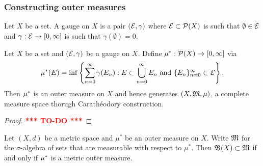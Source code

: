 \documentclass[a4paper]{article}
\newcommand{\TODO}{\textcolor{red}{\textbf{*** TO-DO ***}}}
\begin{document}
\subsubsection{Constructing outer measures}

\begin{defi}
  Let $X$ be a set. A gauge on $X$ is a pair $(\mathcal{E}, \gamma)$
  where $\mathcal{E} \subset \mathcal{P}(X)$ is such that $\emptyset
  \in \mathcal{E}$ and $\gamma : \mathcal{E} \to [0, \infty]$
  is such that $\gamma(\emptyset) = 0$.
\end{defi}

\begin{thm}
  Let $X$ be a set and $(\mathcal{E}, \gamma)$ be a gauge on $X$.
  Define $\mu^*: \mathcal{P}(X) \to [0, \infty]$ via
  \[
  \mu^*(E) = \inf \left\{ \sum_{n=0}^\infty \gamma(E_n):
  E \subset \bigcup_{n=0}^\infty E_n \text{ and }
  \{ E_n \}_{n=0}^\infty \subset \mathcal{E} \right\}.
  \]
  Then $\mu^*$ is an outer measure on $X$ and hence
  generates $(X, \mathfrak{M}, \mu)$, a complete measure space
  thorugh Carath\'eodory construction.
\end{thm}

\begin{proof}
  \TODO
\end{proof}

\begin{thm}
Let $(X,d)$ be a metric space and $\mu^*$ be an outer 
measure on $X$. Write $\mathfrak{M}$ for the $\sigma$-algebra of 
sets that are measurable with respect to $\mu^*$. Then 
$\mathfrak{B}(X) \subset \mathfrak{M}$ if and only if $\mu^*$ is a metric 
outer measure.
\end{thm}
\end{document}
